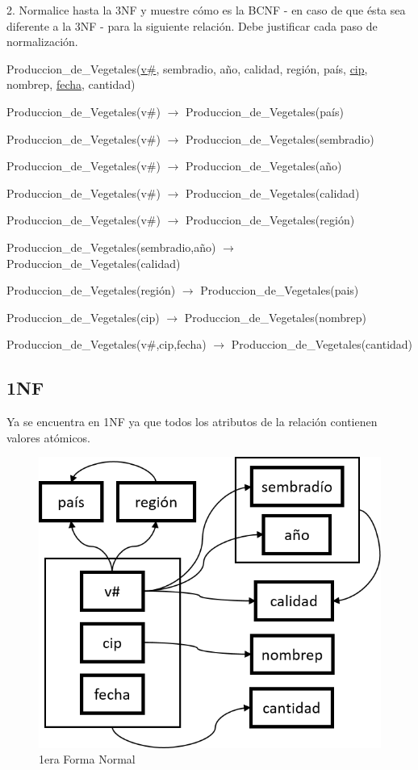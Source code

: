 
2. Normalice hasta la 3NF y muestre cómo es la BCNF - en caso de que ésta sea diferente a la 3NF - para la siguiente relación. Debe justificar cada paso de normalización.

Produccion\_de\_Vegetales(\underline{v\#}, sembradio, año, calidad, región, país, \underline{cip}, nombrep, \underline{fecha}, cantidad)

Produccion\_de\_Vegetales(v\#) $\rightarrow$ Produccion\_de\_Vegetales(país)

Produccion\_de\_Vegetales(v\#) $\rightarrow$ Produccion\_de\_Vegetales(sembradio)

Produccion\_de\_Vegetales(v\#) $\rightarrow$ Produccion\_de\_Vegetales(año)

Produccion\_de\_Vegetales(v\#) $\rightarrow$ Produccion\_de\_Vegetales(calidad)

Produccion\_de\_Vegetales(v\#) $\rightarrow$ Produccion\_de\_Vegetales(región)

Produccion\_de\_Vegetales(sembradio,año) $\rightarrow$ Produccion\_de\_Vegetales(calidad)

Produccion\_de\_Vegetales(región) $\rightarrow$ Produccion\_de\_Vegetales(pais)

Produccion\_de\_Vegetales(cip) $\rightarrow$ Produccion\_de\_Vegetales(nombrep)

Produccion\_de\_Vegetales(v\#,cip,fecha) $\rightarrow$ Produccion\_de\_Vegetales(cantidad)


\subsection*{1NF}
Ya se encuentra en 1NF ya que todos los atributos de la relación contienen valores atómicos.

\begin{figure}[H]
	\centering
	\includegraphics[scale=0.7]{img/1_1nf.png}
	\caption{1era Forma Normal}
\end{figure}

